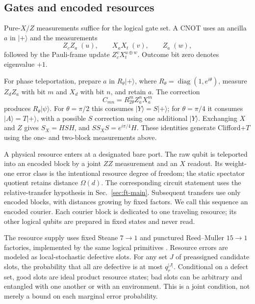 \subsection{Gates and encoded resources}
Pure-$X/Z$ measurements suffice for the logical gate set. A CNOT uses an
ancilla $a$ in $|+\rangle$ and the measurements
\begin{equation}
 Z_cZ_a\;(u),\qquad X_aX_t\;(v),\qquad Z_a\;(w),
 \label{eq:cnot}
\end{equation}
followed by the Pauli-frame update $Z_c^vX_t^{u\oplus w}$.
Outcome bit zero denotes eigenvalue $+1$.

For phase teleportation, prepare $a$ in $R_\theta|+\rangle$, where
$R_\theta=\operatorname{diag}(1,e^{i\theta})$, measure $Z_dZ_a$ with bit $m$
and $X_d$ with bit $n$, and retain $a$. The correction
\begin{equation}
 C_{mn}=R_{2\theta}^{m}Z_a^nX_a^m
 \label{eq:phase}
\end{equation}
produces $R_\theta|\psi\rangle$. For $\theta=\pi/2$ this consumes
$|Y\rangle=S|+\rangle$; for $\theta=\pi/4$ it consumes
$|A\rangle=T|+\rangle$, with a possible $S$ correction using one additional
$|Y\rangle$. Exchanging $X$ and $Z$ gives $S_X=HSH$, and
$SS_XS=e^{i\pi/4}H$. These identities generate Clifford+$T$ using the
one- and two-block measurements above.

A physical resource enters at a designated bare port. The raw qubit is
teleported into an encoded block by a joint $ZZ$ measurement and an $X$
readout. Its weight-one error class is the intentional resource degree of
freedom; the static spectator quotient retains distance $\Omega(d)$. The
corresponding circuit statement uses the relative-transfer hypothesis in
Sec.~\ref{sec:ft-main}. Subsequent transfers use only encoded blocks, with
distances growing by fixed factors. We call this sequence an encoded courier.
Each courier block is dedicated to one traveling resource; its other logical
qubits are prepared in fixed states and never read.

The resource supply uses fixed Steane $7\!\to\!1$ and punctured Reed--Muller
$15\!\to\!1$ factories, implemented by the same logical primitives
\cite{BravyiKitaev,Reichardt,LitinskiMSD}.  Resource errors are modeled as local-stochastic defective slots. For any
set $J$ of preassigned candidate slots, the probability that all are
defective is at most $q_r^{|J|}$. Conditional on a defect set, good slots are
ideal product resource states; bad slots can be arbitrary and entangled
with one another or with an environment. This is a joint condition, not
merely a bound on each marginal error probability.

